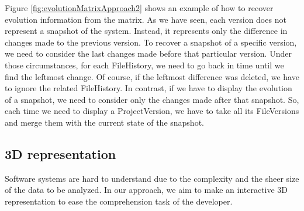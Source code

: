 Figure  \ref{fig:evolutionMatrixApproach2} shows an example of how to recover evolution information from the matrix. 
As we have seen, each version does not represent a snapshot of the system.
Instead, it represents only the difference in changes made to the previous version. 
To recover a snapshot of a specific version, we need to consider the last changes made before that particular version.
Under those circumstances, for each FileHistory, we need to go back in time until we find the leftmost change. Of course, if the leftmost difference was deleted, we have to ignore the related FileHistory.
In contrast, if we have to display the evolution of a snapshot, we need to consider only the changes made after that snapshot. 
So, each time we need to display a ProjectVersion, we have to take all its FileVersions and merge them with the current state of the snapshot. 



\subsection{3D representation}
\label{s:3DRepr}

Software systems are hard to understand due to the complexity and the sheer size of the data to be analyzed.
In our approach, we aim to make an interactive 3D representation to ease the comprehension task of the developer. 
\bigbreak

